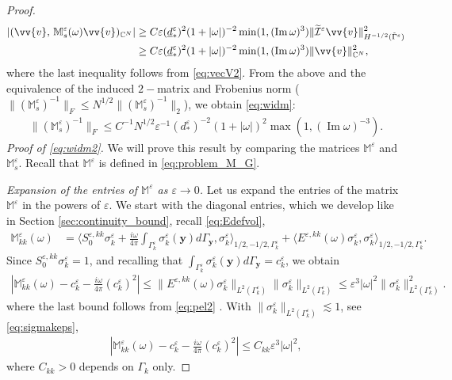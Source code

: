 \documentclass[]{article}
\numberwithin{equation}{section}
\numberwithin{theorem}{section}
\numberwithin{lemma}{section}
\numberwithin{corollary}{section}
\numberwithin{proposition}{section}
\numberwithin{definition}{section}
\newcommand{\mypar}[1]{\noindent\textit{#1}\hspace{0.1em}}
\newcommand{\re}{\varepsilon}
\renewcommand{\vec}{\boldsymbol}
\renewcommand{\Im}{\operatorname{Im}}
\begin{document}
\begin{proof}
\begin{align*}
			\left|	 (\vv{v}, \,\mathbb{M}^{\re}_s(\omega)\vv{v})_{\mathbb{C}^N}\right|&\geq C \re (\underline{{d}}^{\re}_*)^2 (1+|\omega|)^{-2} \min(1, (\Im \omega)^3) \|	\widetilde{\mathcal{I}}^{\re}\vv{v}\|^2_{H^{-1/2}(\tilde{\Gamma}^{\re})}\\
			&\geq C \re (\underline{{d}}^{\re}_*)^2 (1+|\omega|)^{-2} \min(1, (\Im \omega)^3)\|	\vv{v}\|^2_{\mathbb{C}^N},
		\end{align*}
		where the last inequality follows from \eqref{eq:vecV2}. From the above and the equivalence of the induced $2-$matrix and Frobenius norm ($\|(\mathbb{M}^{\re}_s)^{-1}\|_F\leq	N^{1/2}\|(\mathbb{M}^{\re}_s)^{-1}\|_2$), we obtain  \eqref{eq:widm}:
		\begin{align}
			\label{eq:invM}
			\|(\mathbb{M}^{\re}_s)^{-1}\|_F\leq C^{-1} N^{1/2}\re^{-1} (d^{\re}_*)^{-2} (1+|\omega|)^{2} \max(1, (\Im \omega)^{-3}).
		\end{align} 
		\textit{Proof of \eqref{eq:widm2}. }We will prove this result by comparing the matrices $\mathbb{M}^{\re}$ and $\mathbb{M}_s^{\re}$. Recall that $\mathbb{M}^{\re}$ is defined in \eqref{eq:problem_M_G}. 
		
		\mypar{Expansion of the entries of $\mathbb{M}^{\varepsilon}$ as $\varepsilon\rightarrow 0$. }
		Let us expand the entries of the matrix $\mathbb{M}^{\varepsilon}$ in the powers of $\varepsilon$. We start with the diagonal entries, which we develop like in Section \ref{sec:continuity_bound}, recall \eqref{eq:Edefvol},
		\begin{align*}%
			\mathbb{M}^{\varepsilon}_{k k}(\omega)&=\langle S^{\varepsilon,k k}_0\sigma_k^{\varepsilon}+\frac{i\omega}{4\pi}\int_{\Gamma^{\re}_{k}}\sigma_k^{\varepsilon}(\vec{y})d\Gamma_{\vec{y}}, \sigma_k^{\varepsilon}\rangle_{1/2, -1/2, \Gamma^{\re}_k}+ \langle E^{\varepsilon,k k}(\omega)\sigma_k^{\varepsilon}, \sigma_k^{\varepsilon}\rangle_{1/2, -1/2, \Gamma^{\re}_k}.
		\end{align*}
		Since $S^{\varepsilon,kk}_0\sigma^{\re}_k=1$, and recalling that $\int_{\Gamma_k^{\re}}\sigma_k^{\re}(\vec{y})d\Gamma_{\vec{y}}=c_k^{\re}$, we obtain
		\begin{align*}%
			|\mathbb{M}^{\varepsilon}_{kk}(\omega)-c_k^{\varepsilon}-\frac{i\omega}{4\pi}(c_k^{\varepsilon})^2|\leq \|E^{\varepsilon,kk}(\omega)\sigma_k^{\varepsilon}\|_{L^2(\Gamma_k^{\varepsilon})}\|\sigma_k^{\varepsilon}\|_{L^2(\Gamma_k^{\varepsilon})}\leq \varepsilon^3|\omega|^2\|\sigma_k^{\varepsilon}\|^2_{L^2(\Gamma^{\varepsilon}_k)}.
		\end{align*}
		where the last bound follows from \eqref{eq:pel2} . With $\|\sigma_k^{\varepsilon}\|_{L^2(\Gamma_k^{\varepsilon})}\lesssim 1$, see \eqref{eq:sigmakeps}, 
		\begin{align}
			\label{eq:Me}
			|\mathbb{M}^{\varepsilon}_{kk}(\omega)-c_k^{\varepsilon}-\frac{i\omega}{4\pi}(c_k^{\varepsilon})^2|\leq C_{kk} \varepsilon^3|\omega|^2,
		\end{align}
		where $C_{kk}>0$ depends on $\Gamma_k$ only. 
		

\end{proof}
\end{document}
